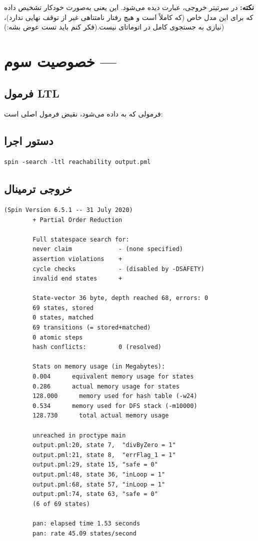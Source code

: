 \documentclass[12pt,a4paper]{article}
\newcommand{\ltlbox}[1]{%
	\begin{center}
		\fbox{\parbox{0.9\linewidth}{\centering $#1$}}
	\end{center}
}
\begin{document}
\textbf{نکته:} در سرتیتر خروجی، عبارت  دیده می‌شود. این یعنی  به‌صورت خودکار تشخیص داده که برای این مدل خاص (که کاملاً  است و هیچ رفتار نامتناهی غیر از توقف نهایی ندارد)، نیازی به جستجوی کامل  در اتوماتای  نیست.(فکر کنم باید تست عوض بشه:))

	
\section{خصوصیت سوم --- }

\subsection{فرمول LTL}	فرمولی که به  داده می‌شود، نقیض فرمول اصلی است:
	\ltlbox{\lnot(\Diamond\, \mathit{endReached})}

\subsection{دستور اجرا}
\begin{latin}
	\begin{lstlisting}[style=codestyle]
		spin -search -ltl reachability output.pml
	\end{lstlisting}
\end{latin}


\subsection{خروجی ترمینال}
\begin{latin}
	\begin{lstlisting}[style=termstyle]
		(Spin Version 6.5.1 -- 31 July 2020)
		+ Partial Order Reduction
		
		Full statespace search for:
		never claim             - (none specified)
		assertion violations    +
		cycle checks            - (disabled by -DSAFETY)
		invalid end states      +
		
		State-vector 36 byte, depth reached 68, errors: 0
		69 states, stored
		0 states, matched
		69 transitions (= stored+matched)
		0 atomic steps
		hash conflicts:         0 (resolved)
		
		Stats on memory usage (in Megabytes):
		0.004      equivalent memory usage for states
		0.286      actual memory usage for states
		128.000      memory used for hash table (-w24)
		0.534      memory used for DFS stack (-m10000)
		128.730      total actual memory usage
		
		unreached in proctype main
		output.pml:20, state 7,  "divByZero = 1"
		output.pml:21, state 8,  "errFlag_1 = 1"
		output.pml:29, state 15, "safe = 0"
		output.pml:48, state 36, "inLoop = 1"
		output.pml:68, state 57, "inLoop = 1"
		output.pml:74, state 63, "safe = 0"
		(6 of 69 states)
		
		pan: elapsed time 1.53 seconds
		pan: rate 45.09 states/second
	\end{lstlisting}
\end{latin}
\end{document}
